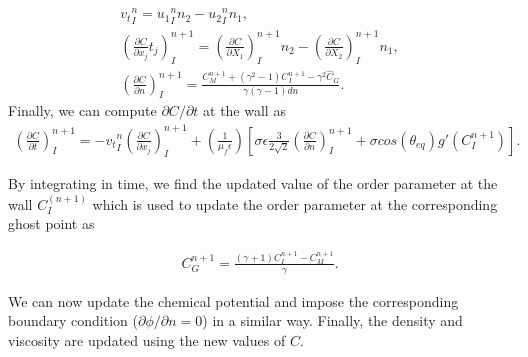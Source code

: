 \documentclass[review]{elsarticle}
\begin{document}
\begin{linenomath}\begin{equation} \label{ProjectingToNT}
\begin{gathered}
{v_t}^{n}_I = {u_1}^{n}_I n_2-{u_2}^{n}_I n_1, \\
\left( \frac{\partial C}{\partial x_j}t_j\right)^{n+1}_I = \left( \frac{\partial C}{\partial X_1}\right)^{n+1}_I n_2-\left( \frac{\partial C}{\partial X_2}\right)^{n+1}_I n_1, \\
\left( \frac{\partial C}{\partial n}\right)^{n+1}_I = \frac{C^{n+1}_M+(\gamma^2-1)C^{n+1}_I-\gamma^2 \hat{C}_G}{\gamma (\gamma-1)dn}.
\end{gathered}
\end{equation}
Finally, we can compute $\partial C / \partial t$ at the wall as
\begin{equation} \label{WallBCS_recast}  
\begin{gathered}
    \left(\frac{\partial C}{\partial t}\right)_I^{n+1}  = -{v_t}^{n}_I \left(\frac{\partial C}{\partial x_j}\right)^{n+1}_I + \left( \frac{1}{\mu_f \epsilon} \right)\left[ \sigma \epsilon \frac{3}{2 \sqrt 2}\left(\frac{\partial C}{\partial n }\right)^{n+1}_I + \sigma cos(\theta_{eq}) g'(C_I^{n+1})\right].
   \end{gathered}
\end{equation}\end{linenomath}
By integrating in time, we find the updated value of the order parameter at the wall $C_I^{(n+1)}$ which is used to update the order parameter at the corresponding 
ghost point as
\begin{linenomath}\begin{equation} \label{UpdateC}
\begin{gathered}
C^{n+1}_G = \frac{(\gamma+1)C^{n+1}_I -C^{n+1}_M}{\gamma}.
\end{gathered}
\end{equation}\end{linenomath}
We can now update the chemical potential and impose the corresponding boundary condition ($\partial \phi/ \partial n = 0$) in a similar way. Finally, the density and viscosity are updated using the new values of $C$.
\end{document}
